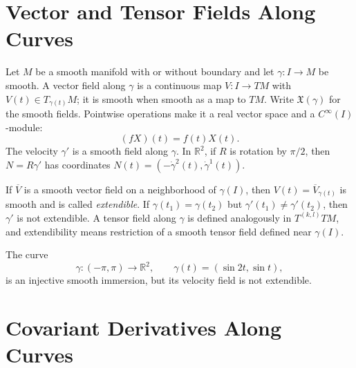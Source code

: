 \section{Vector and Tensor Fields Along Curves}

Let $M$ be a smooth manifold with or without boundary and let
$\gamma\colon I\to M$ be smooth. A vector field along $\gamma$ is a
continuous map $V\colon I\to TM$ with $V(t)\in T_{\gamma(t)}M$; it is smooth
when smooth as a map to $TM$. Write $\mathfrak{X}(\gamma)$ for the smooth
fields. Pointwise operations make it a real vector space and a
$C^\infty(I)$-module:
\[
(fX)(t)=f(t)X(t).
\]
The velocity $\gamma'$ is a smooth field along $\gamma$. In $\mathbb R^2$, if
$R$ is rotation by $\pi/2$, then $N=R\gamma'$ has coordinates
$N(t)=(-\dot\gamma^2(t),\dot\gamma^1(t))$.

If $\overline V$ is a smooth vector field on a neighborhood of $\gamma(I)$,
then $V(t)=\overline V_{\gamma(t)}$ is smooth and is called \emph{extendible}.
If $\gamma(t_1)=\gamma(t_2)$ but $\gamma'(t_1)\ne\gamma'(t_2)$, then $\gamma'$
is not extendible. A tensor field along $\gamma$ is defined analogously in
$T^{(k,l)}TM$, and extendibility means restriction of a smooth tensor field
defined near $\gamma(I)$.

\begin{example}
\label{ex:figure-eight-curve}
The curve
\[
\gamma\colon(-\pi,\pi)\to\mathbb R^2,
\qquad \gamma(t)=(\sin 2t,\sin t),
\]
is an injective smooth immersion, but its velocity field is not extendible.
\end{example}

\section{Covariant Derivatives Along Curves}

